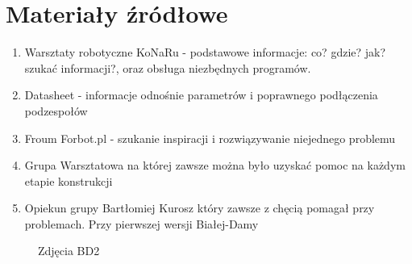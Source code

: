 \documentclass[12pt,a4paper]{article}
\begin{document}
\section{Materiały źródłowe}
\begin{enumerate}
%
\item Warsztaty robotyczne KoNaRu - podstawowe informacje: co? gdzie?
jak? szukać informacji?, oraz obsługa niezbędnych programów.
%
\item Datasheet - informacje odnośnie parametrów i poprawnego podłączenia
podzespołów
%
\item Froum Forbot.pl - szukanie inspiracji i rozwiązywanie niejednego problemu
%
\item Grupa Warsztatowa na której zawsze można było uzyskać pomoc na
każdym etapie konstrukcji
%
\item Opiekun grupy Bartłomiej Kurosz który zawsze z chęcią pomagał przy
problemach. Przy pierwszej wersji Białej-Damy
%
\end{enumerate}



\begin{figure}[tp]
\centering

    
    

  
    \caption{Zdjęcia BD2}
  \end{figure}%




\clearpage
\end{document}
